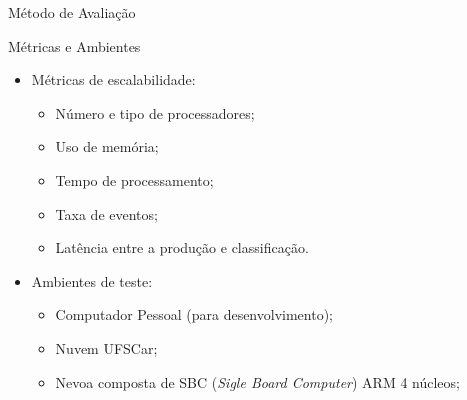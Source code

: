 \documentclass[aspectratio=43,10pt]{beamer}
\begin{document}

  

\begin{frame}[fragile]{Método de Avaliação}
  \begin{alertblock}{Métricas e Ambientes}
    \begin{itemize}
      \item Métricas de escalabilidade:
      \begin{itemize}
        \item Número e tipo de processadores;
        \item Uso de memória;
        \item Tempo de processamento;
        \item Taxa de eventos;
        \item Latência entre a produção e classificação.
      \end{itemize}
      \item Ambientes de teste:
      \begin{itemize}
        \item Computador Pessoal (para desenvolvimento);
        \item Nuvem UFSCar;
        \item Nevoa composta de SBC (\textit{Sigle Board Computer}) ARM 4 núcleos;
      \end{itemize}
    \end{itemize}
  \end{alertblock}
\end{frame}
\end{document}
